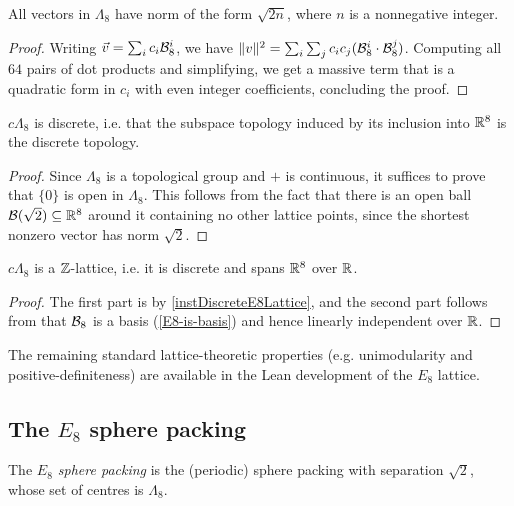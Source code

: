 \begin{lemma}\label{E8-vector-norms}\leanok
  All vectors in $\Lambda_8$ have norm of the form $\sqrt{2n}$, where $n$ is a nonnegative integer.
\end{lemma}
\begin{proof}\leanok
  Writing $\vec{v} = \sum_i c_i\mathcal{B}_8^i$, we have $\|v\|^2 = \sum_i \sum_j c_ic_j (\mathcal{B}_8^i \cdot \mathcal{B}_8^j)$. Computing all $64$ pairs of dot products and simplifying, we get a massive term that is a quadratic form in $c_i$ with even integer coefficients, concluding the proof.
\end{proof}

\begin{lemma}\label{instDiscreteE8Lattice}\leanok
  $c\Lambda_8$ is discrete, i.e. that the subspace topology induced by its inclusion into $\mathbb{R}^8$ is the discrete topology.
\end{lemma}
\begin{proof}\leanok
  Since $\Lambda_8$ is a topological group and $+$ is continuous, it suffices to prove that $\{0\}$ is open in $\Lambda_8$. This follows from the fact that there is an open ball $\mathcal{B}(\sqrt{2}) \subseteq \mathbb{R}^8$ around it containing no other lattice points, since the shortest nonzero vector has norm $\sqrt{2}$.
\end{proof}

\begin{lemma}\label{instLatticeE8}\leanok
  $c\Lambda_8$ is a $\mathbb{Z}$-lattice, i.e. it is discrete and spans $\mathbb{R}^8$ over $\mathbb{R}$.
\end{lemma}
\begin{proof}\leanok
  The first part is by \cref{instDiscreteE8Lattice}, and the second part follows from that $\mathcal{B}_8$ is a basis (\cref{E8-is-basis}) and hence linearly independent over $\mathbb{R}$.
\end{proof}

The remaining standard lattice-theoretic properties (e.g. unimodularity and positive-definiteness) are available in the Lean development of the $E_8$ lattice.

\subsection{The $E_8$ sphere packing}

\begin{definition}\label{E8Packing}\leanok
  The \emph{$E_8$ sphere packing} is the (periodic) sphere packing with separation $\sqrt{2}$, whose set of centres is $\Lambda_8$.
\end{definition}

